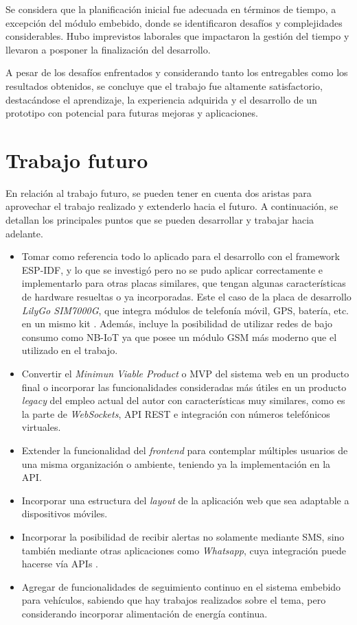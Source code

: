 Se considera que la planificación inicial fue adecuada en términos de tiempo, a excepción del módulo embebido, donde se identificaron desafíos y complejidades considerables. Hubo imprevistos laborales que impactaron la gestión del tiempo y llevaron a posponer la finalización del desarrollo.

A pesar de los desafíos enfrentados y considerando tanto los entregables como los resultados obtenidos, se concluye que el trabajo fue altamente satisfactorio, destacándose el aprendizaje, la experiencia adquirida y el desarrollo de un prototipo con potencial para futuras mejoras y aplicaciones.


\section{Trabajo futuro}

En relación al trabajo futuro, se pueden tener en cuenta dos aristas para aprovechar el trabajo realizado y extenderlo hacia el futuro. A continuación, se detallan los principales puntos que se pueden desarrollar y trabajar hacia adelante.

\begin{itemize}
	\item Tomar como referencia todo lo aplicado para el desarrollo con el framework ESP-IDF, y lo que se investigó pero no se pudo aplicar correctamente e implementarlo para otras placas similares, que tengan algunas características de hardware resueltas o ya incorporadas. Este el caso de la placa de desarrollo \textit{LilyGo SIM7000G}, que integra módulos de telefonía móvil, GPS, batería, etc. en un mismo kit \citep{7600G:1}. Además, incluye la posibilidad de utilizar redes de bajo consumo como NB-IoT \citep{NBIOT:1} ya que posee un módulo GSM más moderno que el utilizado en el trabajo.
	\item Convertir el \textit{Minimun Viable Product} o MVP del sistema web en un producto final o incorporar las funcionalidades consideradas más útiles en un producto \textit{legacy} del empleo actual del autor con características muy similares, como es la parte de \textit{WebSockets}, API REST e integración con números telefónicos virtuales.
	\item Extender la funcionalidad del \textit{frontend} para contemplar múltiples usuarios de una misma organización o ambiente, teniendo ya la implementación en la API.
	\item Incorporar una estructura del \textit{layout} de la aplicación web que sea adaptable a dispositivos móviles.
	\item Incorporar la posibilidad de recibir alertas no solamente mediante SMS, sino también mediante otras aplicaciones como \textit{Whatsapp}, cuya integración puede hacerse vía APIs \citep{TWILIO:3}.
	\item Agregar de funcionalidades de seguimiento continuo en el sistema embebido para vehículos, sabiendo que hay trabajos realizados sobre el tema, pero considerando incorporar alimentación de energía continua.
\end{itemize}
